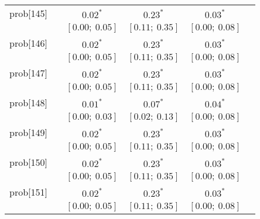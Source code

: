 \begin{table}
\begin{center}
\begin{tabular}{l c c c c c }
prob[145]   &                                  & $0.02^{*}$                & $0.23^{*}$                & $0.03^{*}$              &                         \\
            &                                  & $[0.00;\ 0.05]$           & $[0.11;\ 0.35]$           & $[0.00;\ 0.08]$         &                         \\
prob[146]   &                                  & $0.02^{*}$                & $0.23^{*}$                & $0.03^{*}$              &                         \\
            &                                  & $[0.00;\ 0.05]$           & $[0.11;\ 0.35]$           & $[0.00;\ 0.08]$         &                         \\
prob[147]   &                                  & $0.02^{*}$                & $0.23^{*}$                & $0.03^{*}$              &                         \\
            &                                  & $[0.00;\ 0.05]$           & $[0.11;\ 0.35]$           & $[0.00;\ 0.08]$         &                         \\
prob[148]   &                                  & $0.01^{*}$                & $0.07^{*}$                & $0.04^{*}$              &                         \\
            &                                  & $[0.00;\ 0.03]$           & $[0.02;\ 0.13]$           & $[0.00;\ 0.08]$         &                         \\
prob[149]   &                                  & $0.02^{*}$                & $0.23^{*}$                & $0.03^{*}$              &                         \\
            &                                  & $[0.00;\ 0.05]$           & $[0.11;\ 0.35]$           & $[0.00;\ 0.08]$         &                         \\
prob[150]   &                                  & $0.02^{*}$                & $0.23^{*}$                & $0.03^{*}$              &                         \\
            &                                  & $[0.00;\ 0.05]$           & $[0.11;\ 0.35]$           & $[0.00;\ 0.08]$         &                         \\
prob[151]   &                                  & $0.02^{*}$                & $0.23^{*}$                & $0.03^{*}$              &                         \\
            &                                  & $[0.00;\ 0.05]$           & $[0.11;\ 0.35]$           & $[0.00;\ 0.08]$         &                         \\

\end{tabular}
\end{center}
\end{table}
